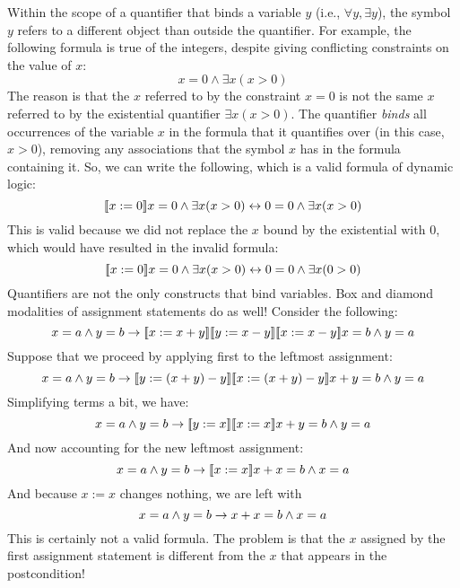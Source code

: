 \documentclass[11pt,twoside]{scrartcl}
\begin{document}
Within the scope of a quantifier that binds a variable $y$ (i.e., $\forall y, \exists y$), the symbol $y$ refers to a different object than outside the quantifier.
For example, the following formula is true of the integers, despite giving conflicting constraints on the value of $x$:
\[
x = 0 \land \exists x (x > 0)
\]
The reason is that the $x$ referred to by the constraint $x = 0$ is not the same $x$ referred to by the existential quantifier $\exists x (x > 0)$. 
The quantifier \emph{binds} all occurrences of the variable $x$ in the formula that it quantifies over (in this case, $x > 0$), removing any associations that the symbol $x$ has in the formula containing it.
So, we can write the following, which is a valid formula of dynamic logic:
\[
\dbox{x := 0}{x = 0 \land \exists x (x > 0)} \lbisubjunct 0 = 0 \land \exists x (x > 0)
\]
This is valid because we did not replace the $x$ bound by the existential with 0, which would have resulted in the invalid formula:
\[
\dbox{x := 0}{x = 0 \land \exists x (x > 0)} \lbisubjunct 0 = 0 \land \exists x (0 > 0)
\]
Quantifiers are not the only constructs that bind variables.
Box and diamond modalities of assignment statements do as well!
Consider the following:
\begin{equation}
\label{eq:wrong1}
x = a \land y = b \limply {\dbox{x := x + y}{\dbox{y := x - y}{\dbox{x := x - y}{x = b \land y = a}}}}
\end{equation}
Suppose that we proceed by applying  first to the leftmost assignment:
\begin{equation}
\label{eq:wrong2}
x = a \land y = b \limply \dbox{y := (x+y) - y}{\dbox{x := (x+y) - y}{x+y = b \land y = a}}
\end{equation}
Simplifying terms a bit, we have:
\begin{equation}
\label{eq:wrong3}
x = a \land y = b \limply \dbox{y := x}{\dbox{x := x}{x+y = b \land y = a}}
\end{equation}
And now accounting for the new leftmost assignment:
\begin{equation}
\label{eq:wrong4}
x = a \land y = b \limply \dbox{x := x}{x+x = b \land x = a}
\end{equation}
And because $x := x$ changes nothing, we are left with
\begin{equation}
\label{eq:wrong5}
x = a \land y = b \limply x+x = b \land x = a
\end{equation}
This is certainly not a valid formula.
The problem is that the $x$ assigned by the first assignment statement is different from the $x$ that appears in the postcondition!
\end{document}
